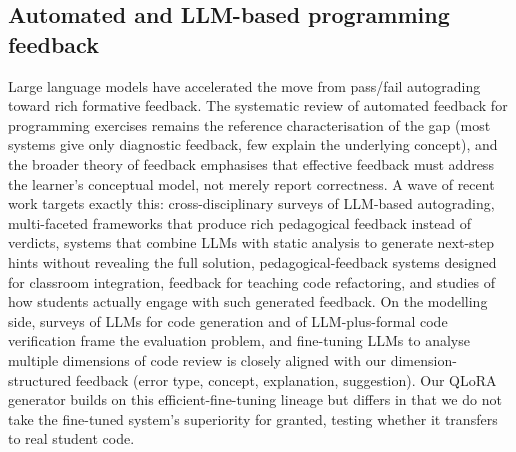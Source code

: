 \documentclass[sageh]{sagej}
\begin{document}
\subsection{Automated and LLM-based programming feedback}
Large language models have accelerated the move from pass/fail autograding toward rich formative feedback. The systematic review of automated feedback for programming exercises remains the reference characterisation of the gap (most systems give only diagnostic feedback, few explain the underlying concept), and the broader theory of feedback emphasises that effective feedback must address the learner's conceptual model, not merely report correctness.\cite{keuning2019slr,hattie2007feedback} A wave of recent work targets exactly this: cross-disciplinary surveys of LLM-based autograding,\cite{eneye2025autograding} multi-faceted frameworks that produce rich pedagogical feedback instead of verdicts,\cite{sahu2025autograder} systems that combine LLMs with static analysis to generate next-step hints without revealing the full solution,\cite{birillo2024onestep} pedagogical-feedback systems designed for classroom integration,\cite{scholz2025partnering} feedback for teaching code refactoring,\cite{khairnar2025refactoring} and studies of how students actually engage with such generated feedback.\cite{jacobs2025feedback} On the modelling side, surveys of LLMs for code generation and of LLM-plus-formal code verification frame the evaluation problem,\cite{huynh2025codegen,dolcetti2025dual} and fine-tuning LLMs to analyse multiple dimensions of code review is closely aligned with our dimension-structured feedback (error type, concept, explanation, suggestion).\cite{yu2025codereview} Our QLoRA generator builds on this efficient-fine-tuning lineage\cite{hu2021lora,dettmers2023qlora,yang2025lora,jain2023neftune,hui2024qwen25coder} but differs in that we do not take the fine-tuned system's superiority for granted, testing whether it transfers to real student code.
\end{document}
